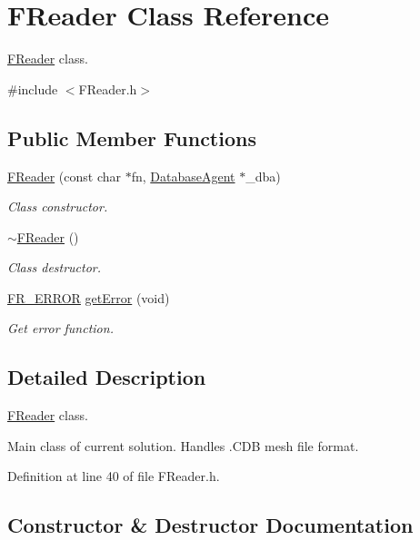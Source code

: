 \hypertarget{class_f_reader}{}\section{F\+Reader Class Reference}
\label{class_f_reader}


\hyperlink{class_f_reader}{F\+Reader} class.  




{\ttfamily \#include $<$F\+Reader.\+h$>$}

\subsection*{Public Member Functions}
\begin{DoxyCompactItemize}
\item 
\hyperlink{class_f_reader_aa55d84e221cf8cfa66ac5e692ae5c994}{F\+Reader} (const char $\ast$fn, \hyperlink{class_database_agent}{Database\+Agent} $\ast$\+\_\+dba)
\begin{DoxyCompactList}\small\item\em Class constructor. \end{DoxyCompactList}\item 
\hyperlink{class_f_reader_aca652fd77d9796535f920496e3329083}{$\sim$\+F\+Reader} ()
\begin{DoxyCompactList}\small\item\em Class destructor. \end{DoxyCompactList}\item 
\hyperlink{_file_structs_8h_ae183556f32e14e06d49b270ca950d90a}{F\+R\+\_\+\+E\+R\+R\+OR} \hyperlink{class_f_reader_abd5dae242af5ba546df2e27acf1644e9}{get\+Error} (void)
\begin{DoxyCompactList}\small\item\em Get error function. \end{DoxyCompactList}\end{DoxyCompactItemize}


\subsection{Detailed Description}
\hyperlink{class_f_reader}{F\+Reader} class. 

Main class of current solution. Handles .C\+DB mesh file format. 

Definition at line 40 of file F\+Reader.\+h.



\subsection{Constructor \& Destructor Documentation}
